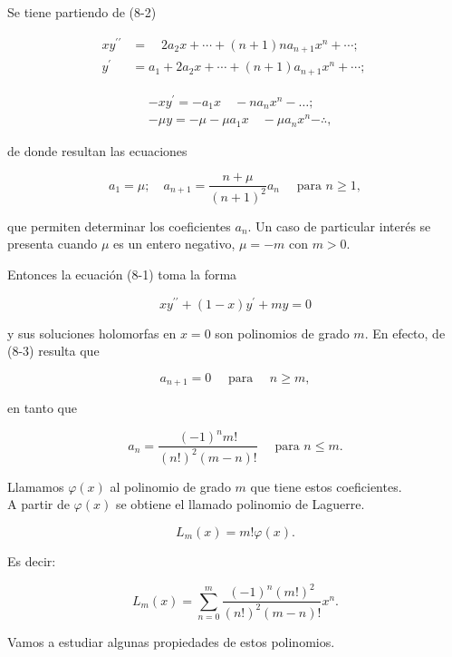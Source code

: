 \documentclass[10pt]{article}
\theoremstyle{plain}
\theoremstyle{definition}
\theoremstyle{remark}
\begin{document}
Se tiene partiendo de (8-2)

$$
\begin{aligned}
x y^{\prime \prime} & =\quad 2 a_{2} x+\cdots+(n+1) n a_{n+1} x^{n}+\cdots ; \\
y^{\prime} & =a_{1}+2 a_{2} x+\cdots+(n+1) a_{n+1} x^{n}+\cdots ; ~
\end{aligned}
$$


$$
\begin{aligned}
& -x y^{\prime}=-a_{1} x \quad-n a_{n} x^{n}-\ldots ; \\
& -\mu y=-\mu-\mu a_{1} x \quad-\mu a_{n} x^{n}-\therefore,
\end{aligned}
$$

de donde resultan las ecuaciones


\begin{equation*}
a_{1}=\mu ; \quad a_{n+1}=\frac{n+\mu}{(n+1)^{2}} a_{n} \quad \text { para } n \geqslant 1, \tag{8-3}
\end{equation*}


que permiten determinar los coeficientes $a_{n}$. Un caso de particular interés se presenta cuando $\mu$ es un entero negativo, $\mu=-m$ con $m>0$.

Entonces la ecuación (8-1) toma la forma


\begin{equation*}
x y^{\prime \prime}+(1-x) y^{\prime}+m y=0 \tag{8-4}
\end{equation*}


y sus soluciones holomorfas en $x=0$ son polinomios de grado $m$. En efecto, de (8-3) resulta que

$$
a_{n+1}=0 \quad \text { para } \quad n \geqslant m,
$$

en tanto que

$$
a_{n}=\frac{(-1)^{n} m!}{(n!)^{2}(m-n)!} \quad \text { para } n \leqslant m .
$$

Llamamos $\varphi(x)$ al polinomio de grado $m$ que tiene estos coeficientes.\\
A partir de $\varphi(x)$ se obtiene el llamado polinomio de Laguerre.

$$
L_{m}(x)=m!\varphi(x) .
$$

Es decir:


\begin{equation*}
L_{m}(x)=\sum_{n=0}^{m} \frac{(-1)^{n}(m!)^{2}}{(n!)^{2}(m-n)!} x^{n} . \tag{8-5}
\end{equation*}


Vamos a estudiar algunas propiedades de estos polinomios.
\end{document}
